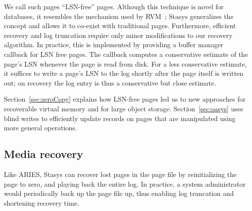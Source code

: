 \documentclass[letterpaper,twocolumn,10pt]{article}
\newcommand{\yad}{Stasys\xspace}
\newcommand{\eat}[1]{}
\begin{document}
We call such pages ``LSN-free'' pages.  Although this technique is
novel for databases, it resembles the mechanism used by
RVM~\cite{lrvm}; \yad generalizes the concept and allows it to
co-exist with traditional pages.  Furthermore, efficient recovery and
log truncation require only minor modifications to our recovery
algorithm.  In practice, this is implemented by providing a buffer manager callback
for LSN free pages.  The callback computes a
conservative estimate of the page's LSN whenever the page is read from disk.
For a less conservative estimate, it suffices to write a page's LSN to
the log shortly after the page itself is written out; on recovery the
log entry is thus a conservative but close estimate.

Section~\ref{sec:zeroCopy} explains how LSN-free pages led us to new 
approaches for recoverable virtual memory and for large object storage.  
Section~\ref{sec:oasys} uses blind writes to efficiently update records 
on pages that are manipulated using more general operations.

\subsection{Media recovery}

Like ARIES, \yad can recover lost pages in the page file by
reinitializing the page to zero, and playing back the entire log.  In
practice, a system administrator would periodically back up the page file
up, thus enabling log truncation and shortening recovery time.

\eat{  This is pretty redundant.
\subsection{Modular operations semantics}

The smallest unit of a \yad transaction is the {\em operation}.  An
operation consists of a {\em redo} function, {\em undo} function, and
a log format.  At runtime or if recovery decides to reapply the
operation, the redo function is invoked with the contents of the log
entry as an argument.  During abort, or if recovery decides to undo
the operation, the undo function is invoked with the contents of the
log as an argument.  Like Berkeley DB, and most database toolkits, we
allow system designers to define new operations.  Unlike earlier
systems, we have based our library of operations on object oriented
collection libraries, and have built complex index structures from
simpler structures.  These modules are all directly available,
providing a wide range of data structures to applications, and
facilitating the develop of more complex structures through reuse.  We
compare the performance of our modular approach with a monolithic
implementation on top of \yad, using Berkeley DB as a baseline.
}
\end{document}
